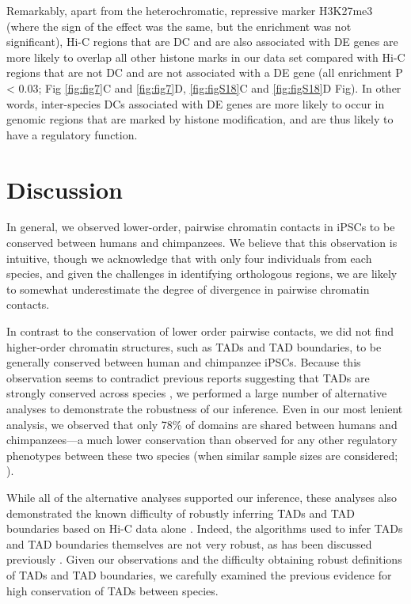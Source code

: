 Remarkably, apart from the heterochromatic, repressive marker H3K27me3 (where the sign of the effect was the same, but the enrichment was not significant), Hi-C regions that are DC and are also associated with DE genes are more likely to overlap all other histone marks in our data set compared with Hi-C regions that are not DC and are not associated with a DE gene (all enrichment P {\textless} 0.03; Fig \ref{fig:fig7}C and \ref{fig:fig7}D, \ref{fig:figS18}C and \ref{fig:figS18}D Fig). In other words, inter-species DCs associated with DE genes are more likely to occur in genomic regions that are marked by histone modification, and are thus likely to have a regulatory function.

\pagebreak

\section{Discussion}\label{ch02-discussion}

In general, we observed lower-order, pairwise chromatin contacts in iPSCs to be conserved between humans and chimpanzees. We believe that this observation is intuitive, though we acknowledge that with only four individuals from each species, and given the challenges in identifying orthologous regions, we are likely to somewhat underestimate the degree of divergence in pairwise chromatin contacts.

In contrast to the conservation of lower order pairwise contacts, we did not find higher-order chromatin structures, such as TADs and TAD boundaries, to be generally conserved between human and chimpanzee iPSCs. Because this observation seems to contradict previous reports suggesting that TADs are strongly conserved across species \cite{Rao.2014, Dixon.2012}, we performed a large number of alternative analyses to demonstrate the robustness of our inference. Even in our most lenient analysis, we observed that only 78\% of domains are shared between humans and chimpanzees---a much lower conservation than observed for any other regulatory phenotypes between these two species (when similar sample sizes are considered; \cite{Pai.2011, Shulha.2012, Calarco.2007, Trizzino.2017, Prescott.2015}).

While all of the alternative analyses supported our inference, these analyses also demonstrated the known difficulty of robustly inferring TADs and TAD boundaries based on Hi-C data alone \cite{Ramirez.2018, Dali.2017}. Indeed, the algorithms used to infer TADs and TAD boundaries themselves are not very robust, as has been discussed previously \cite{Dali.2017, Forcato.2017}. Given our observations and the difficulty obtaining robust definitions of TADs and TAD boundaries, we carefully examined the previous evidence for high conservation of TADs between species.

